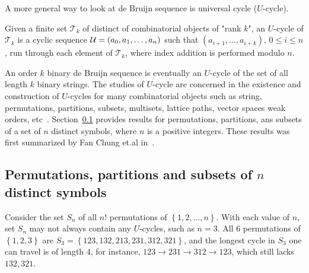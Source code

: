 A more general way to look at de Bruijn sequence is universal cycle ($U$-cycle). 
\begin{definition}
    Given a finite set $\mathcal{T}_{k}$ of distinct of combinatorial objects of "rank $k$", an $U$-cycle of $\mathcal{T}_{k}$ is a cyclic sequence ${\cal U}=(a_0,a_1,\ldots,a_n)$ such that $(a_{i+1},\ldots,a_{i+k})$, $0\leq i\leq n$, run through each element of $\mathcal{T}_{k}$, where index addition is performed modulo $n$.
\end{definition} 
An order $k$ binary de Bruijn sequence is eventually an $U$-cycle of the set of all length $k$ binary strings. The studies of $U$-cycle are concerned in the existence and construction of $U$-cycles for many combinatorial objects such as string, permutations, partitions, subsets, multisets, lattice paths, vector spaces weak orders, etc~\cite{chung1992universal,horan2013universal,jackson2009research,johnson2009universal,hurlbert2009universal,jackson2009recursive}. Section~\ref{subsect:fanchung} provides results for permutations, partitions, ans subsets of a set of $n$ distinct symbols, where $n$ is a positive integers. These results was first summarized by Fan Chung et.al in~\cite{chung1992universal}.

\subsection{Permutations, partitions and subsets of \texorpdfstring{$n$}{n} distinct symbols}\label{subsect:fanchung}
Consider the set $S_{n}$ of all $n!$ permutations of $\left\{1,2,\ldots,n\right\}$. With each value of $n$, set $S_{n}$ may not always contain any $U$-cycles, such as $n=3$. All $6$ permutations of $\left\{1,2,3\right\}$ are $S_{3}=\left\{123,132,213,231,312,321\right\}$, and the longest cycle in $S_{3}$ one can travel is of length $4$, for instance,  $123\rightarrow231\rightarrow312\rightarrow123$, which still lacks $132, 321$. 

